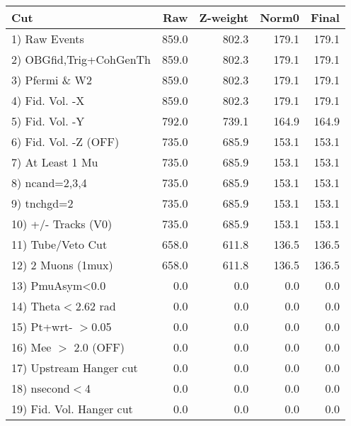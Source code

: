  \begin{table}[h!]\centering
 \begin{tabular}{||l||r|r|r|r||}
 \hline
 \hline
 Cut & Raw & Z-weight & Norm0 & Final \\
 \hline
  1) Raw Events           &       859.0 &       802.3 &       179.1 &       179.1 \\
  2) OBGfid,Trig+CohGenTh &       859.0 &       802.3 &       179.1 &       179.1 \\
  3) Pfermi \& W2         &       859.0 &       802.3 &       179.1 &       179.1 \\
  4) Fid. Vol. -X         &       859.0 &       802.3 &       179.1 &       179.1 \\
  5) Fid. Vol. -Y         &       792.0 &       739.1 &       164.9 &       164.9 \\
  6) Fid. Vol. -Z (OFF)   &       735.0 &       685.9 &       153.1 &       153.1 \\
  7) At Least 1 Mu        &       735.0 &       685.9 &       153.1 &       153.1 \\
  8) ncand=2,3,4          &       735.0 &       685.9 &       153.1 &       153.1 \\
  9) tnchgd=2             &       735.0 &       685.9 &       153.1 &       153.1 \\
 10) +/- Tracks (V0)      &       735.0 &       685.9 &       153.1 &       153.1 \\
 11) Tube/Veto Cut        &       658.0 &       611.8 &       136.5 &       136.5 \\
 12) 2 Muons (1mux)       &       658.0 &       611.8 &       136.5 &       136.5 \\
 13) PmuAsym<0.0          &         0.0 &         0.0 &         0.0 &         0.0 \\
 14) Theta$<$2.62 rad     &         0.0 &         0.0 &         0.0 &         0.0 \\
 15) Pt+wrt- $>$0.05      &         0.0 &         0.0 &         0.0 &         0.0 \\
 16) Mee $>$ 2.0  (OFF)   &         0.0 &         0.0 &         0.0 &         0.0 \\
 17) Upstream Hanger cut  &         0.0 &         0.0 &         0.0 &         0.0 \\
 18) nsecond$<$4          &         0.0 &         0.0 &         0.0 &         0.0 \\
 19) Fid. Vol. Hanger cut &         0.0 &         0.0 &         0.0 &         0.0 \\

\end{tabular}
\end{table}
